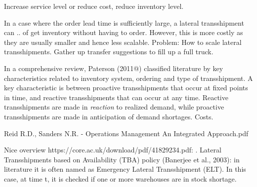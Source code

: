 \documentclass[../../main.tex]{subfiles}
\begin{document}
Increase service level or reduce cost, reduce inventory level.



In a case where the order lead time is sufficiently large, a lateral transshipment can .. of get inventory without having to order. However, this is more costly as they are usually smaller and hence less scalable. Problem: How to scale lateral transshipments. Gather up transfer suggestions to fill up a full truck.

In a comprehensive review, Paterson (2011@) classified literature by key characteristics related to inventory system, ordering and type of transshipment. A key characteristic is between proactive transshipments that occur at fixed points in time, and reactive transshipments that can occur at any time. Reactive transshipments are made in \textit{reaction} to realized demand, while proactive transshipments are made in anticipation of demand shortages. Costs.


Reid R.D., Sanders N.R. - Operations Management An Integrated Approach.pdf




Nice overview https://core.ac.uk/download/pdf/41829234.pdf:
. Lateral Transshipments based on Availability (TBA) policy (Banerjee et al., 2003): in literature it is often named as Emergency Lateral Transshipment (ELT). In this case, at time t, it is checked if one or more warehouses are in stock shortage. 



\end{document}

